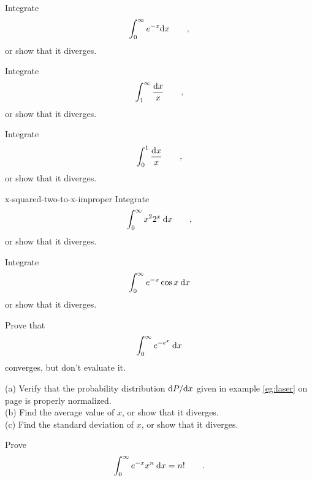 \begin{hwsection}

\begin{hw}
Integrate
\begin{equation*}
  \int_0^\infty e^{-x} \textup{d} x \qquad ,
\end{equation*}
or show that it diverges.
\end{hw}

\begin{hw}
Integrate
\begin{equation*}
  \int_1^\infty \frac{\textup{d} x}{x} \qquad ,
\end{equation*}
or show that it diverges.
\end{hw}

\begin{hw}
Integrate
\begin{equation*}
  \int_0^1 \frac{\textup{d} x}{x} \qquad ,
\end{equation*}
or show that it diverges.
\end{hw}

\begin{hwwithsoln}{x-squared-two-to-x-improper}
Integrate
\begin{equation*}
  \int_0^\infty x^2 2^x \:\textup{d} x \qquad ,
\end{equation*}
or show that it diverges.
\end{hwwithsoln}

\begin{hw}
Integrate
\begin{equation*}
  \int_0^\infty e^{-x}\cos x \: \textup{d} x
\end{equation*}
or show that it diverges.
\end{hw}

\begin{hw}
Prove that
\begin{equation*}
  \int_0^\infty e^{-e^x} \: \textup{d} x
\end{equation*}
converges, but don't evaluate it.
\end{hw}

\begin{hw}\label{hw:laser}
(a) Verify that the probability distribution $\textup{d} P/\textup{d} x$ given in example \ref{eg:laser} on page \pageref{eg:laser}
is properly normalized.\\
(b) Find the average value of $x$, or show that it diverges.\\
(c) Find the standard deviation of $x$, or show that it diverges.
\end{hw}

\begin{hw}[2]
Prove
\begin{equation*}
  \int_0^\infty e^{-x}x^n\:\textup{d} x = n! \qquad .
\end{equation*}
\end{hw}

\end{hwsection}
